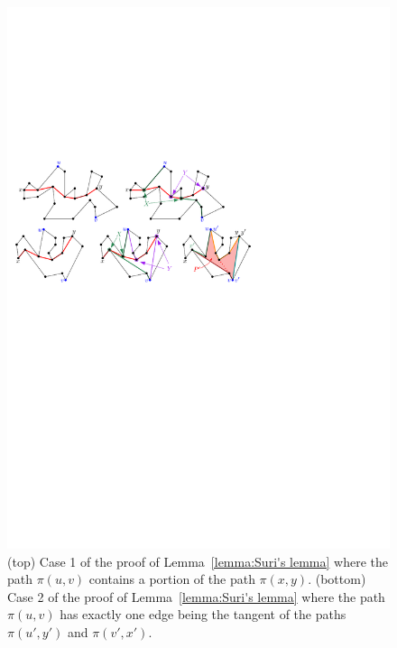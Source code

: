 \documentclass[a4paper,UKenglish]{lipics}
\newcommand{\p}[2]{\ensuremath{\pi(#1, #2)}}
\begin{document}
\begin{figure}[tb]
\centering
\includegraphics{img/OutputSensitive.pdf}

\caption{\small (top) Case 1 of the proof of Lemma~\ref{lemma:Suri's lemma} where the path $\p{u}{v}$ contains a portion of the path $\p{x}{y}$.
(bottom) Case 2 of the proof of Lemma~\ref{lemma:Suri's lemma} where the path $\p{u}{v}$ has exactly one edge being the tangent of the paths $\p{u'}{y'}$ and $\p{v'}{x'}$.}
\label{fig:Output Sensitive Algorithm}
\end{figure}
\end{document}
